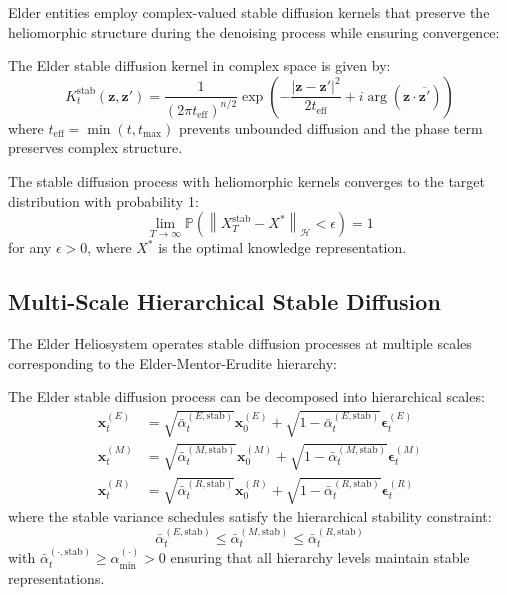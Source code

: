 Elder entities employ complex-valued stable diffusion kernels that preserve the heliomorphic structure during the denoising process while ensuring convergence:

\begin{definition}
The Elder stable diffusion kernel in complex space is given by:
\begin{equation}
K_t^{\text{stab}}(\mathbf{z}, \mathbf{z}') = \frac{1}{(2\pi t_{\text{eff}})^{n/2}} \exp\left(-\frac{|\mathbf{z} - \mathbf{z}'|^2}{2t_{\text{eff}}} + i\arg(\mathbf{z} \cdot \overline{\mathbf{z}'})\right)
\end{equation}
where $t_{\text{eff}} = \min(t, t_{\max})$ prevents unbounded diffusion and the phase term preserves complex structure.
\end{definition}

\begin{theorem}
The stable diffusion process with heliomorphic kernels converges to the target distribution with probability 1:
\begin{equation}
\lim_{T \to \infty} \mathbb{P}\left(\left\|X_T^{\text{stab}} - X^*\right\|_{\mathcal{H}} < \epsilon\right) = 1
\end{equation}
for any $\epsilon > 0$, where $X^*$ is the optimal knowledge representation.
\end{theorem}

\subsection{Multi-Scale Hierarchical Stable Diffusion}

The Elder Heliosystem operates stable diffusion processes at multiple scales corresponding to the Elder-Mentor-Erudite hierarchy:

\begin{theorem}
The Elder stable diffusion process can be decomposed into hierarchical scales:
\begin{align}
\mathbf{x}_t^{(E)} &= \sqrt{\bar{\alpha}_t^{(E,\text{stab})}} \mathbf{x}_0^{(E)} + \sqrt{1-\bar{\alpha}_t^{(E,\text{stab})}} \boldsymbol{\epsilon}_t^{(E)} \\
\mathbf{x}_t^{(M)} &= \sqrt{\bar{\alpha}_t^{(M,\text{stab})}} \mathbf{x}_0^{(M)} + \sqrt{1-\bar{\alpha}_t^{(M,\text{stab})}} \boldsymbol{\epsilon}_t^{(M)} \\
\mathbf{x}_t^{(R)} &= \sqrt{\bar{\alpha}_t^{(R,\text{stab})}} \mathbf{x}_0^{(R)} + \sqrt{1-\bar{\alpha}_t^{(R,\text{stab})}} \boldsymbol{\epsilon}_t^{(R)}
\end{align}
where the stable variance schedules satisfy the hierarchical stability constraint:
\begin{equation}
\bar{\alpha}_t^{(E,\text{stab})} \leq \bar{\alpha}_t^{(M,\text{stab})} \leq \bar{\alpha}_t^{(R,\text{stab})}
\end{equation}
with $\bar{\alpha}_t^{(\cdot,\text{stab})} \geq \alpha_{\min}^{(\cdot)} > 0$ ensuring that all hierarchy levels maintain stable representations.
\end{theorem}

